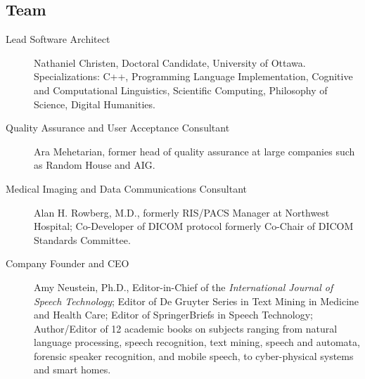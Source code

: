 
\begin{frame}{}
\section{Team}


\begin{center}
\begin{minipage}{0.94\textwidth}
{\LARGE \setlength{\leftmargini}{3pt}\begin{description}
\item[Lead Software Architect]  {\llsep} Nathaniel Christen, Doctoral Candidate, University of Ottawa.  
Specializations: C++, Programming Language 
Implementation, Cognitive and Computational 
Linguistics, Scientific Computing, Philosophy 
of Science, Digital Humanities.{\thrule}
\item[Quality Assurance and User Acceptance 
Consultant]  {\llsep} Ara Mehetarian, 
former head of quality assurance at large companies such as Random House and AIG.{\thrule}
\item[Medical Imaging and Data Communications Consultant]  {\llsep} Alan H. Rowberg, M.D., formerly
RIS/PACS Manager at Northwest Hospital; Co-Developer of DICOM protocol formerly Co-Chair
of DICOM Standards Committee.{\thrule}
\item[Company Founder and CEO]  {\llsep} Amy Neustein, Ph.D., Editor-in-Chief of the \textit{International Journal of
Speech Technology}; Editor of De Gruyter Series in Text Mining in Medicine and Health Care;
Editor of SpringerBriefs in Speech Technology; Author/Editor of 12 academic books on subjects
ranging from natural language processing, speech recognition, 
text mining, speech and
automata, forensic speaker recognition, 
and mobile speech, to cyber-physical systems 
and smart homes.\vspace{1em}  
\end{description}}
\end{minipage}
\end{center}


\end{frame}
